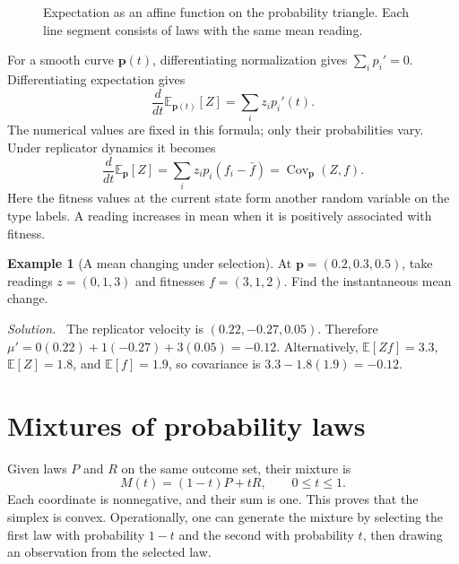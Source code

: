 \documentclass[11pt,oneside,openany]{book}
\theoremstyle{definition}
\newtheorem{example}{Example}[chapter]
\theoremstyle{remark}
\newenvironment{solution}{\par\smallskip\noindent\textit{Solution.}\ }{\par\smallskip}
\newcommand{\E}{\mathbb{E}}
\newcommand{\Cov}{\operatorname{Cov}}
\newcommand{\p}{\mathbf{p}}
\numberwithin{equation}{chapter}
\begin{document}
\begin{figure}[htbp]
\centering
{}
\caption{Expectation as an affine function on the probability triangle. Each line segment consists of laws with the same mean reading.}
\end{figure}

For a smooth curve $\p(t)$, differentiating normalization gives $\sum_i p_i'=0$. Differentiating expectation gives
\begin{equation}\label{eq:meanvelocity}
\frac{d}{dt}\E_{\p(t)}[Z]=\sum_i z_i p_i'(t).
\end{equation}
The numerical values are fixed in this formula; only their probabilities vary. Under replicator dynamics it becomes
\begin{equation}\label{eq:covarianceidentity}
\frac{d}{dt}\E_\p[Z]=\sum_i z_i p_i(f_i-\bar f)=\Cov_\p(Z,f).
\end{equation}
Here the fitness values at the current state form another random variable on the type labels. A reading increases in mean when it is positively associated with fitness.

\begin{example}[A mean changing under selection]
At $\p=(0.2,0.3,0.5)$, take readings $z=(0,1,3)$ and fitnesses $f=(3,1,2)$. Find the instantaneous mean change.
\begin{solution}
The replicator velocity is $(0.22,-0.27,0.05)$. Therefore $\mu'=0(0.22)+1(-0.27)+3(0.05)=-0.12$. Alternatively, $\E[Zf]=3.3$, $\E[Z]=1.8$, and $\E[f]=1.9$, so covariance is $3.3-1.8(1.9)=-0.12$.
\end{solution}
\end{example}

\section{Mixtures of probability laws}
Given laws $P$ and $R$ on the same outcome set, their mixture is
\begin{equation}\label{eq:mixture}
M(t)=(1-t)P+tR,\qquad 0\leq t\leq1.
\end{equation}
Each coordinate is nonnegative, and their sum is one. This proves that the simplex is convex. Operationally, one can generate the mixture by selecting the first law with probability $1-t$ and the second with probability $t$, then drawing an observation from the selected law.
\end{document}
